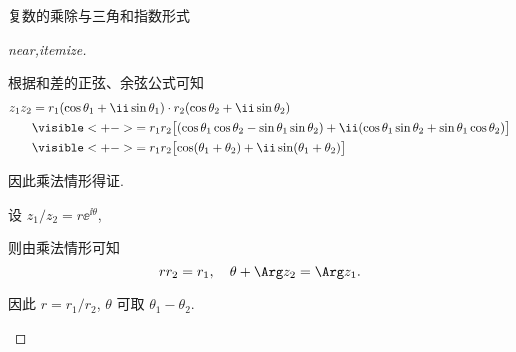 \begin{frame}{复数的乘除与三角和指数形式}
	\onslide<+->
	\begin{proof}[near,itemize]
		\begin{itemize*}
			\item 根据和差的正弦、余弦公式可知
			\begin{align*}
				z_1z_2&=r_1(\cos\theta_1+\ii\sin\theta_1)\cdot
				r_2(\cos\theta_2+\ii\sin\theta_2)\\
				&\visible<+->{=r_1r_2\bigl[(\cos\theta_1\cos\theta_2-\sin\theta_1\sin\theta_2)
				+\ii(\cos\theta_1\sin\theta_2+\sin\theta_1\cos\theta_2)\bigr]}\\
				&\visible<+->{=r_1r_2\bigl[\cos(\theta_1+\theta_2)+\ii\sin(\theta_1+\theta_2)\bigr]}
			\end{align*}
			\item 因此乘法情形得证.
			\item 设 $z_1/z_2=r\ee^{\ii\theta}$,
			\item 则由乘法情形可知 
			\[
				rr_2=r_1,\quad \theta+\Arg z_2=\Arg z_1.
			\]
			\item 因此 $r=r_1/r_2$, $\theta$ 可取 $\theta_1-\theta_2$.\qedhere
		\end{itemize*}
	\end{proof}
\end{frame}


